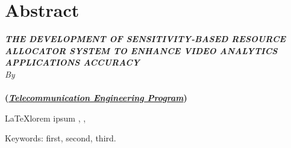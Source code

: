 \clearpage
\chapter*{Abstract}

\begin{center}
	\linespread{1}
	\large{\bfseries{
			\MakeUppercase{\textit{The Development of Sensitivity-based Resource Allocator 
			System to Enhance Video Analytics Applications Accuracy}}
		}
	}\\[1\baselineskip]
	\normalsize{\textit{By}\\}
	\large{ 
		\bfseries \theauthor\\
		(\textit{\underline{Telecommunication Engineering Program}})
	}\\[2\baselineskip]
\end{center}

\medskip

\begin{spacing}{1.0}
	
	\LaTeX lorem ipsum \citep{dds}, \citep{videostorm}, \citep{concierge}
	\itshape{
		\blindtext
		
		\blindtext
		
		Keywords: first, second, third.
	}
\end{spacing}

\clearpage
